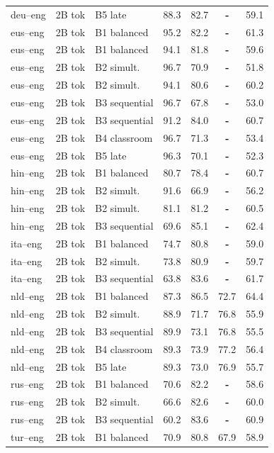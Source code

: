 \begin{table}[t]
\begin{tabular}{lll cc cc}
deu--eng & 2B tok & B5 late & 88.3 & 82.7 & \textbf{-} & 59.1 \\
eus--eng & 2B tok & B1 balanced & 95.2 & 82.2 & \textbf{-} & 61.3 \\
eus--eng  & 2B tok & B1 balanced & 94.1 & 81.8 & \textbf{-} & 59.6 \\
eus--eng & 2B tok & B2 simult. & 96.7 & 70.9 & \textbf{-} & 51.8 \\
eus--eng  & 2B tok & B2 simult. & 94.1 & 80.6 & \textbf{-} & 60.2 \\
eus--eng & 2B tok & B3 sequential & 96.7 & 67.8 & \textbf{-} & 53.0 \\
eus--eng  & 2B tok & B3 sequential & 91.2 & 84.0 & \textbf{-} & 60.7 \\
eus--eng & 2B tok & B4 classroom & 96.7 & 71.3 & \textbf{-} & 53.4 \\
eus--eng & 2B tok & B5 late & 96.3 & 70.1 & \textbf{-} & 52.3 \\
hin--eng  & 2B tok & B1 balanced & 80.7 & 78.4 & \textbf{-} & 60.7 \\
hin--eng & 2B tok & B2 simult. & 91.6 & 66.9 & \textbf{-} & 56.2 \\
hin--eng  & 2B tok & B2 simult. & 81.1 & 81.2 & \textbf{-} & 60.5 \\
hin--eng  & 2B tok & B3 sequential & 69.6 & 85.1 & \textbf{-} & 62.4 \\
ita--eng  & 2B tok & B1 balanced & 74.7 & 80.8 & \textbf{-} & 59.0 \\
ita--eng  & 2B tok & B2 simult. & 73.8 & 80.9 & \textbf{-} & 59.7 \\
ita--eng  & 2B tok & B3 sequential & 63.8 & 83.6 & \textbf{-} & 61.7 \\
nld--eng & 2B tok & B1 balanced & 87.3 & 86.5 & 72.7 & 64.4 \\
nld--eng & 2B tok & B2 simult. & 88.9 & 71.7 & 76.8 & 55.9 \\
nld--eng & 2B tok & B3 sequential & 89.9 & 73.1 & 76.8 & 55.5 \\
nld--eng & 2B tok & B4 classroom & 89.3 & 73.9 & 77.2 & 56.4 \\
nld--eng & 2B tok & B5 late & 89.3 & 73.0 & 76.9 & 55.7 \\
rus--eng  & 2B tok & B1 balanced & 70.6 & 82.2 & \textbf{-} & 58.6 \\
rus--eng  & 2B tok & B2 simult. & 66.6 & 82.6 & \textbf{-} & 60.0 \\
rus--eng  & 2B tok & B3 sequential & 60.2 & 83.6 & \textbf{-} & 60.9 \\
tur--eng  & 2B tok & B1 balanced & 70.9 & 80.8 & 67.9 & 58.9 \\

\end{tabular}
\end{table}
